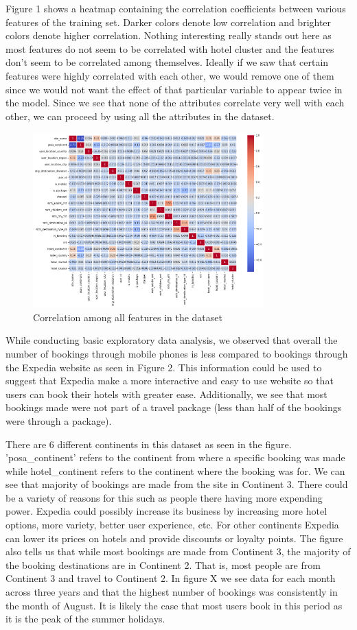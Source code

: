 \documentclass[conference]{IEEEtran}
\begin{document}
Figure 1 shows a heatmap containing the correlation coefficients between various features of the training set. Darker colors denote low correlation and brighter colors denote higher correlation. Nothing interesting really stands out here as most features do not seem to be correlated with hotel cluster and the features don't seem to be correlated among themselves. Ideally if we saw that certain features were highly correlated with each other, we would remove one of them since we would not want the effect of that particular variable to appear twice in the model. Since we see that none of the attributes correlate very well with each other, we can proceed by using all the attributes in the dataset.

\begin{figure}[ht!] %
\centering
\includegraphics[width=3.5in]{heatmap.png}
\caption{Correlation among all features in the dataset}
\label{heatmap}
\end{figure}
While conducting basic exploratory data analysis, we observed that overall the number of bookings through mobile phones is less compared to bookings through the Expedia website as seen in Figure 2. This information could be used to suggest that Expedia make a more interactive and easy to use website so that users can book their hotels with greater ease. Additionally, we see that most bookings made were not part of a travel package (less than half of the bookings were through a package).

There are 6 different continents in this dataset as seen in the figure. 'posa\_continent' refers to the continent from where a specific booking was made while hotel\_continent refers to the continent where the booking was for. We can see that majority of bookings are made from the site in Continent 3. There could be a variety of reasons for this such as people there having more expending power. Expedia could possibly increase its business by increasing more hotel options, more variety, better user experience, etc. For other continents Expedia can lower its prices on hotels and provide discounts or loyalty points. The figure also tells us that while most bookings are made from Continent 3, the majority of the booking destinations are in Continent 2. That is, most people are from Continent 3 and travel to Continent 2. In figure X we see data for each month across three years and that the highest number of bookings was consistently in the month of August. It is likely the case that most users book in this period as it is the peak of the summer holidays.
\end{document}
